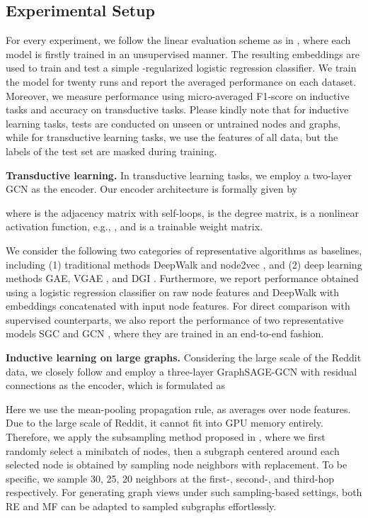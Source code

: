 \documentclass{article}
\theoremstyle{remark}
\begin{document}
\subsection{Experimental Setup}

For every experiment, we follow the linear evaluation scheme as in \cite{Velickovic:2019tu}, where each model is firstly trained in an unsupervised manner. The resulting embeddings are used to train and test a simple -regularized logistic regression classifier.
We train the model for twenty runs and report the averaged performance on each dataset. Moreover, we measure performance using micro-averaged F1-score on inductive tasks and accuracy on transductive tasks.
Please kindly note that for inductive learning tasks, tests are conducted on unseen or untrained nodes and graphs, while for transductive learning tasks, we use the features of all data, but the labels of the test set are masked during training.



\textbf{Transductive learning.\quad}
In transductive learning tasks, we employ a two-layer GCN \cite{Kipf:2016tc} as the encoder. Our encoder architecture is formally given by

where  is the adjacency matrix with self-loops,  is the degree matrix,  is a nonlinear activation function, e.g., , and  is a trainable weight matrix.

We consider the following two categories of representative algorithms as baselines, including (1) traditional methods DeepWalk \cite{Perozzi:2014ib} and node2vec \cite{Grover:2016ex}, and (2) deep learning methods GAE, VGAE \cite{Kipf:2016ul}, and DGI \cite{Velickovic:2019tu}. Furthermore, we report performance obtained using a logistic regression classifier on raw node features and DeepWalk with embeddings concatenated with input node features. For direct comparison with supervised counterparts, we also report the performance of two representative models SGC \cite{Wu:2019vz} and GCN \cite{Kipf:2016tc}, where they are trained in an end-to-end fashion.

\textbf{Inductive learning on large graphs.\quad}
Considering the large scale of the Reddit data, we closely follow \cite{Velickovic:2019tu} and employ a three-layer GraphSAGE-GCN \cite{Hamilton:2017tp} with residual connections \cite{He:2016ib} as the encoder, which is formulated as

Here we use the mean-pooling propagation rule, as  averages over node features. Due to the large scale of Reddit, it cannot fit into GPU memory entirely. Therefore, we apply the subsampling method proposed in \cite{Hamilton:2017tp}, where we first randomly select a minibatch of nodes, then a subgraph centered around each selected node is obtained by sampling node neighbors with replacement. To be specific, we sample 30, 25, 20 neighbors at the first-, second-, and third-hop respectively. For generating graph views under such sampling-based settings, both RE and MF can be adapted to sampled subgraphs effortlessly.
\end{document}

